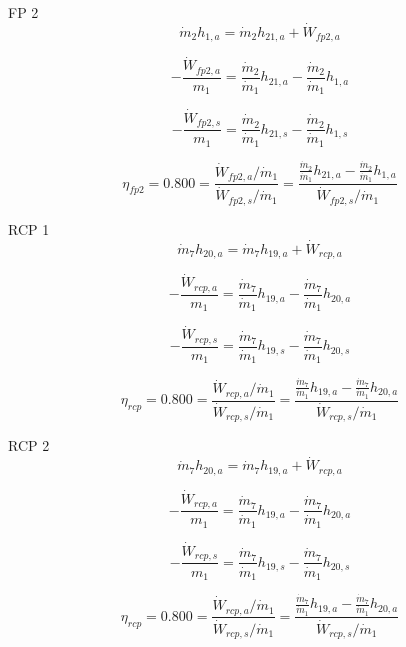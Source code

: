 \documentclass{article}
\begin{document}
FP 2
\begin{equation}
\dot{m}_{ 2}h_{ 1,a} = \dot{m}_{ 2}h_{21,a} + \dot{W}_{fp2,a}
\end{equation}

\begin{equation}
-\frac{\dot{W}_{fp2,a}}{m_1} = \frac{\dot{m}_{ 2}}{\dot{m}_{ 1}}h_{21,a} - \frac{\dot{m}_{ 2}}{\dot{m}_{ 1}}h_{ 1,a}\end{equation}

\begin{equation}
-\frac{\dot{W}_{fp2,s}}{m_1} = \frac{\dot{m}_{ 2}}{\dot{m}_{ 1}}h_{21,s} - \frac{\dot{m}_{ 2}}{\dot{m}_{ 1}}h_{ 1,s}\end{equation}

\begin{equation}
\eta_{fp2} =    0.800 = \frac{\dot{W}_{fp2,a} / \dot{m}_{1}}{\dot{W}_{fp2,s} / \dot{m}_{1}} = \frac{
\frac{\dot{m}_{ 2}}{\dot{m}_{ 1}}h_{21,a} - \frac{\dot{m}_{ 2}}{\dot{m}_{ 1}}h_{ 1,a}}{\dot{W}_{fp2,s} / \dot{m}_{1}}
\end{equation}


RCP 1
\begin{equation}
\dot{m}_{ 7}h_{20,a} = \dot{m}_{ 7}h_{19,a} + \dot{W}_{rcp,a}
\end{equation}

\begin{equation}
-\frac{\dot{W}_{rcp,a}}{m_1} = \frac{\dot{m}_{ 7}}{\dot{m}_{ 1}}h_{19,a} - \frac{\dot{m}_{ 7}}{\dot{m}_{ 1}}h_{20,a}\end{equation}

\begin{equation}
-\frac{\dot{W}_{rcp,s}}{m_1} = \frac{\dot{m}_{ 7}}{\dot{m}_{ 1}}h_{19,s} - \frac{\dot{m}_{ 7}}{\dot{m}_{ 1}}h_{20,s}\end{equation}

\begin{equation}
\eta_{rcp} =    0.800 = \frac{\dot{W}_{rcp,a} / \dot{m}_{1}}{\dot{W}_{rcp,s} / \dot{m}_{1}} = \frac{
\frac{\dot{m}_{ 7}}{\dot{m}_{ 1}}h_{19,a} - \frac{\dot{m}_{ 7}}{\dot{m}_{ 1}}h_{20,a}}{\dot{W}_{rcp,s} / \dot{m}_{1}}
\end{equation}


RCP 2
\begin{equation}
\dot{m}_{ 7}h_{20,a} = \dot{m}_{ 7}h_{19,a} + \dot{W}_{rcp,a}
\end{equation}

\begin{equation}
-\frac{\dot{W}_{rcp,a}}{m_1} = \frac{\dot{m}_{ 7}}{\dot{m}_{ 1}}h_{19,a} - \frac{\dot{m}_{ 7}}{\dot{m}_{ 1}}h_{20,a}\end{equation}

\begin{equation}
-\frac{\dot{W}_{rcp,s}}{m_1} = \frac{\dot{m}_{ 7}}{\dot{m}_{ 1}}h_{19,s} - \frac{\dot{m}_{ 7}}{\dot{m}_{ 1}}h_{20,s}\end{equation}

\begin{equation}
\eta_{rcp} =    0.800 = \frac{\dot{W}_{rcp,a} / \dot{m}_{1}}{\dot{W}_{rcp,s} / \dot{m}_{1}} = \frac{
\frac{\dot{m}_{ 7}}{\dot{m}_{ 1}}h_{19,a} - \frac{\dot{m}_{ 7}}{\dot{m}_{ 1}}h_{20,a}}{\dot{W}_{rcp,s} / \dot{m}_{1}}
\end{equation}
\end{document}
